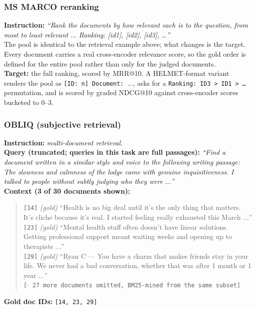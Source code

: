 \subsubsection{MS MARCO reranking}

\textbf{Instruction:} \emph{``Rank the documents by how relevant each is to the question, from most to
least relevant $\dots$ Ranking: [id1], [id2], [id3], \dots''}\\
The pool is identical to the retrieval example above; what changes is the target. Every document
carries a real cross-encoder relevance score, so the gold order is defined for the entire pool
rather than only for the judged documents.\\
\textbf{Target:} the full ranking, scored by MRR@10. A HELMET-format variant renders the pool as
\texttt{[ID: n] Document: $\dots$}, asks for a \texttt{Ranking: ID3 > ID1 > \dots} permutation, and
is scored by graded NDCG@10 against cross-encoder scores bucketed to 0--3.

\subsubsection{OBLIQ (subjective retrieval)}

\textbf{Instruction:} \emph{multi-document retrieval.}\\
\textbf{Query (truncated; queries in this task are full passages):} \emph{``Find a document written
in a similar style and voice to the following writing passage: The slowness and calmness of the
lodge came with genuine inquisitiveness. I talked to people without subtly judging who they were
$\dots$''}\\
\textbf{Context (3 of 30 documents shown):}
\begin{quote}\small
\texttt{[14]} \emph{(gold)} ``Health is no big deal until it's the only thing that matters. It's
cliche because it's real. I started feeling really exhausted this March $\dots$''\\
\texttt{[23]} \emph{(gold)} ``Mental health stuff often doesn't have linear solutions. Getting
professional support meant waiting weeks and opening up to therapists $\dots$''\\
\texttt{[29]} \emph{(gold)} ``Ryan C --- You have a charm that makes friends stay in your life. We
never had a bad conversation, whether that was after 1 month or 1 year $\dots$''\\
\texttt{[$\cdot$ 27 more documents omitted, BM25-mined from the same subset]}
\end{quote}
\textbf{Gold doc IDs:} \texttt{[14, 23, 29]}

